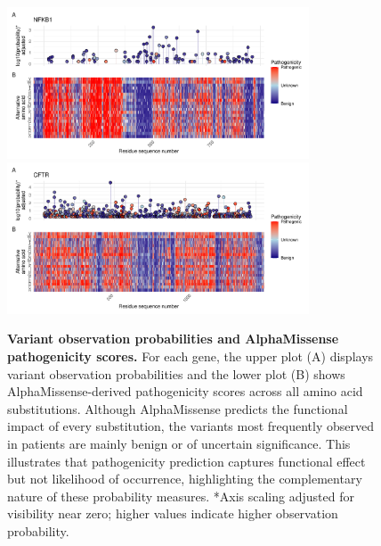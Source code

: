 \begin{figure}[ht]
\begin{center}
    \includegraphics[width=0.8\textwidth]{../images/p_alphamissense_NFKB1.pdf}
    \includegraphics[width=0.8\textwidth]{../images/p_alphamissense_CFTR.pdf}
\end{center}
\caption{\textbf{Variant observation probabilities and AlphaMissense pathogenicity scores.} 
For each gene, the upper plot (A) displays variant observation probabilities and the lower plot (B) shows AlphaMissense-derived pathogenicity scores across all amino acid substitutions. Although AlphaMissense predicts the functional impact of every substitution, the variants most frequently observed in patients are mainly benign or of uncertain significance. This illustrates that pathogenicity prediction captures functional effect but not likelihood of occurrence, highlighting the complementary nature of these probability measures. *Axis scaling adjusted for visibility near zero; higher values indicate higher observation probability.}
 \label{fig:alphamissense}
\end{figure}

